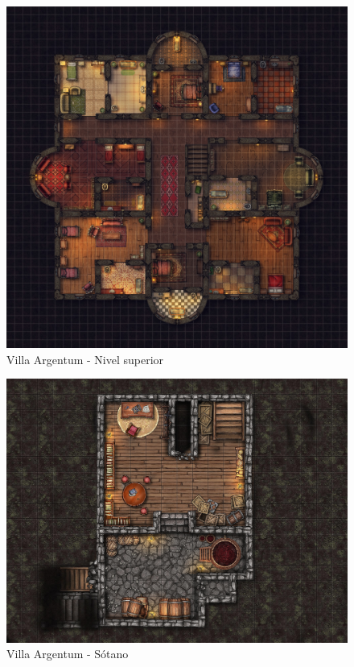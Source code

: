 \documentclass[10pt,twoside,twocolumn,openany]{dndbook}
\begin{document}
\begin{figure}[hb!]
  \centering
  \includegraphics[width=\textwidth]{maps/villa-argentum-l1.jpg}
  \caption{Villa Argentum - Nivel superior}
  \label{fig:val1full}
\end{figure}

\begin{figure}[hb!]
  \centering
  \includegraphics[width=\textwidth]{maps/villa-argentum-s1.jpg}
  \caption{Villa Argentum - Sótano}
  \label{fig:vas1full}
\end{figure}
\end{document}
